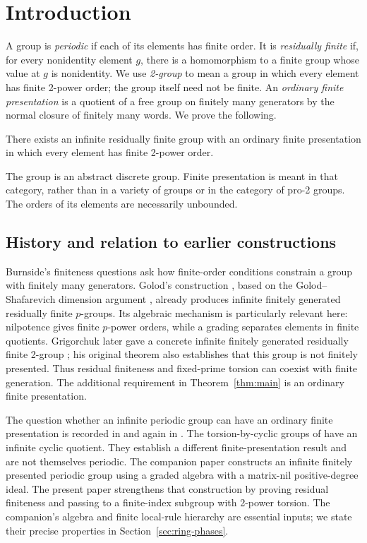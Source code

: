 \section{Introduction}\label{sec:introduction}

A group is \emph{periodic} if each of its elements has finite order.
It is \emph{residually finite} if, for every nonidentity element $g$,
there is a homomorphism to a finite group whose value at $g$ is
nonidentity. We use \emph{2-group} to mean a group in which every
element has finite 2-power order; the group itself need not be finite.
An \emph{ordinary finite presentation} is a quotient of a free group
on finitely many generators by the normal closure of finitely many
words. We prove the following.

\begin{theorem}\label{thm:main}
There exists an infinite residually finite group with an ordinary finite
presentation in which every element has finite 2-power order.
\end{theorem}

The group is an abstract discrete group. Finite presentation is meant
in that category, rather than in a variety of groups or in the category
of pro-2 groups. The orders of its elements are necessarily unbounded.

\subsection*{History and relation to earlier constructions}

Burnside's finiteness questions \cite{Burnside1902} ask how finite-order
conditions constrain a group with finitely many generators. Golod's
construction \cite[Example~2]{Golod1964}, based on the
Golod--Shafarevich dimension argument \cite{GolodShafarevich1964},
already produces infinite finitely generated residually finite
$p$-groups. Its algebraic mechanism is particularly relevant here:
nilpotence gives finite $p$-power orders, while a grading separates
elements in finite quotients. Grigorchuk later gave a concrete infinite
finitely generated residually finite 2-group
\cite{Grigorchuk1980}; his original theorem also establishes that this
group is not finitely presented. Thus residual finiteness and fixed-prime
torsion can coexist with finite generation. The additional requirement
in Theorem~\ref{thm:main} is an ordinary finite presentation.

The question whether an infinite periodic group can have an ordinary
finite presentation is recorded in
\cite[p.~45]{OlshanskiiSapir2003} and again in
\cite[Section~2.2(IX)]{HaettelOsajda2025}. The torsion-by-cyclic
groups of \cite[Theorem~1.1]{OlshanskiiSapir2003} have an infinite
cyclic quotient. They establish a different finite-presentation result
and are not themselves periodic. The companion paper
\cite{Companion} constructs an infinite finitely presented periodic
group using a graded algebra with a matrix-nil positive-degree ideal.
The present paper strengthens
that construction by proving residual finiteness and passing to a
finite-index subgroup with 2-power torsion. The companion's algebra
and finite local-rule hierarchy are essential inputs; we state their
precise properties in Section~\ref{sec:ring-phases}.

